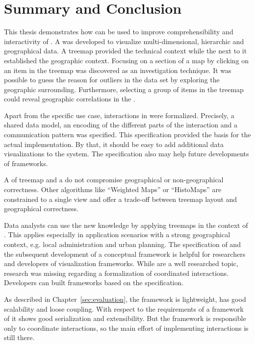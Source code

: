 \chapter{Summary and Conclusion}\label{sec:conclusion}

This thesis demonstrates how \cmvs{} can be used to improve comprehensibility and interactivity of \tmaps{}.
A \cmv{} was developed to visualize multi-dimensional, hierarchic and geographical data.
A treemap provided the technical context while the \gv{} next to it established the geographic context.
Focusing on a section of a map by clicking on an item in the treemap was discovered as an investigation technique.
It was possible to guess the reason for outliers in the data set by exploring the geographic surrounding.
Furthermore, selecting a group of items in the treemap could reveal geographic correlations in the \gv{}.

Apart from the specific use case, interactions in \cmvs{} were formalized.
Precisely, a shared data model, an encoding of the different parts of the interaction and a communication pattern was specified.
This specification provided the basis for the actual implementation.
By that, it should be easy to add additional data visualizations to the system.
The specification also may help future developments of \cmv{} frameworks.

A \cmv{} of treemap and a \gv{} do not compromise geographical or non-geographical correctness.
Other algorithms like ``Weighted Maps'' or ``HistoMaps'' are constrained to a single view and offer a trade-off between treemap layout and geographical correctness.

Data analysts can use the new knowledge by applying treemaps in the context of \dss{}.
This applies especially in application scenarios with a strong geographical context, e.g. local administration and urban planning.
The specification of \cmvs{} and the subsequent development of a conceptual framework is helpful for researchers and developers of visualization frameworks.
While \cmvs{} are a well researched topic, research was missing regarding a formalization of coordinated interactions.
Developers can built frameworks based on the specification.

As described in Chapter~\ref{sec:evaluation}, the framework is lightweight, has good scalability and loose coupling.
With respect to the requirements of a framework of \cmvs{} it shows good serialization and extensibility.
But the framework is responsible only to coordinate interactions, so the main effort of implementing interactions is still there.

